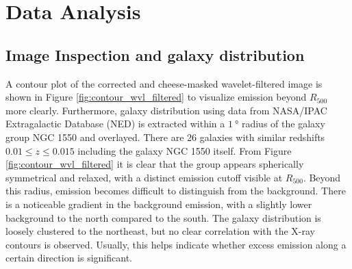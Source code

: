 
\chapter{Data Analysis}
\label{sec:data_analysis}
\section{Image Inspection and galaxy distribution}\label{sec:image_inspection}
%
A contour plot of the corrected and cheese-masked wavelet-filtered image is shown in Figure \ref{fig:contour_wvl_filtered} to visualize emission beyond \(R_{500}\) more clearly. Furthermore, galaxy distribution using data from NASA/IPAC Extragalactic Database (NED) is extracted within a \(\SI{1}{\degree}\) radius of the galaxy group NGC 1550 and overlayed. There are 26 galaxies with similar redshifts \(0.01 \leq z \leq 0.015\) including the galaxy NGC 1550 itself. From Figure \ref{fig:contour_wvl_filtered} it is clear that the group appears spherically symmetrical and relaxed, with a distinct emission cutoff visible at \(R_{500}\). Beyond this radius, emission becomes difficult to distinguish from the background. There is a noticeable gradient in the background emission, with a slightly lower background to the north compared to the south. The galaxy distribution is loosely clustered to the northeast, but no clear correlation with the X-ray contours is observed. Usually, this helps indicate whether excess emission along a certain direction is significant.

